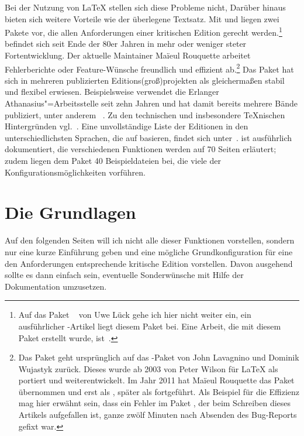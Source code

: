Bei der Nutzung von \LaTeX{} stellen sich diese Probleme nicht, Darüber hinaus bieten sich 
weitere Vorteile wie der überlegene Textsatz. Mit  und \reledmac 
liegen zwei Pakete vor, die allen Anforderungen einer kritischen Edition gerecht 
werden.\footnote{Auf das Paket ~\cite{ednotes} von Uwe Lück gehe ich 
hier nicht weiter ein, ein ausführlicher \TUGboat-Artikel liegt diesem Paket bei. 
Eine Arbeit, die mit diesem Paket erstellt wurde, ist~\cite{mariev:joh_ant}.} 
\reledmac befindet sich seit Ende der 80er Jahren in mehr oder weniger steter Fortentwicklung. 
Der aktuelle Maintainer Maïeul Rouquette arbeitet Fehlerberichte oder Feature-Wünsche 
freundlich und effizient ab.\footnote{Das Paket \reledmac \cite{reledmac} geht 
ursprünglich auf das \plainTeX{}-Paket  von John Lavagnino und 
Dominik Wujastyk zurück. Dieses wurde ab 2003 von Peter Wilson für \LaTeX{} 
als  portiert und weiterentwickelt. Im Jahr 2011 hat Maïeul 
Rouquette das Paket übernommen und erst als , später als \reledmac fortgeführt. 
Als Beispiel für die Effizienz mag hier erwähnt sein, dass ein Fehler im Paket 
\reledmac, der beim Schreiben dieses Artikels aufgefallen ist, ganze zwölf Minuten nach 
Absenden des Bug-Reports gefixt war.} Das Paket hat sich in mehreren publizierten 
Editions(groß)projekten als gleichermaßen stabil und flexibel erwiesen. %
Beispielsweise verwendet die Erlanger Athanasius"=Arbeitsstelle %
seit zehn Jahren 
 und hat damit bereits mehrere Bände publiziert, unter anderem%
~\cite{athanasius_3_1_4}. Zu den technischen und insbesondere \TeX{}nischen 
Hintergründen vgl.~\cite{stockhausen:mde2016/2}. Eine unvollständige Liste der Editionen in den unterschiedlichsten 
Sprachen, die auf  basieren, findet sich unter~\cite{reledmac-benutzung}. 
\reledmac ist 
ausführlich dokumentiert, die verschiedenen Funktionen werden auf 70 Seiten 
erläutert; zudem liegen dem Paket 40 Beispieldateien bei, die viele der 
Konfigurationsmöglichkeiten vorführen.


\section{Die Grundlagen}\label{apparate-grundlagen-anfang}

Auf den folgenden Seiten will ich nicht alle dieser Funktionen vorstellen, sondern nur eine kurze Einführung geben und eine mögliche Grundkonfiguration für eine den Anforderungen entsprechende kritische Edition vorstellen. 
Davon ausgehend sollte es dann einfach sein, eventuelle Sonderwünsche mit Hilfe der Dokumentation umzusetzen.

